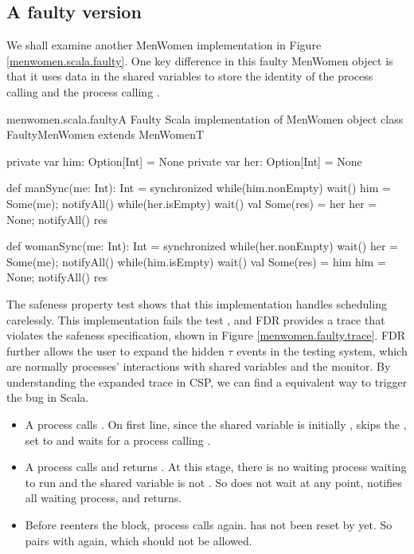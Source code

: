 \documentclass[a4paper, 12pt]{article}
\begin{document}
\subsection{A faulty version}
We shall examine another MenWomen implementation in Figure \ref{menwomen.scala.faulty}. One key difference in this faulty MenWomen object is that it uses  data in the shared variables to store the identity of the process calling  and the process calling . 

\begin{scalafloat}{menwomen.scala.faulty}{A Faulty Scala implementation of MenWomen object}
class FaultyMenWomen extends MenWomenT{
  private var him: Option[Int] = None
  private var her: Option[Int] = None

  def manSync(me: Int): Int = synchronized{
    while(him.nonEmpty) wait()
    him = Some(me); notifyAll()
    while(her.isEmpty) wait()   
    val Some(res) = her
    her = None; notifyAll()
    res
  }

  def womanSync(me: Int): Int = synchronized{
    while(her.nonEmpty) wait()
    her = Some(me); notifyAll()
    while(him.isEmpty) wait()  
    val Some(res) = him
    him = None; notifyAll()
    res
  }
}
\end{scalafloat}

The safeness property test shows that this implementation handles scheduling carelessly. This implementation fails the test \CSPM{Spec2Thread [T= System2}, and FDR provides a trace that violates the safeness specification, shown in Figure \ref{menwomen.faulty.trace}. FDR further allows the user to expand the hidden $\tau$ events in the testing system, which are normally processes' interactions with shared variables and the monitor. By understanding the expanded trace in CSP, we can find a equivalent way to trigger the bug in Scala.


\begin{itemize}
  \item A process  calls . On first line, since the shared variable  is initially ,  skips the , set  to  and waits for a process calling .
  \item A process  calls  and returns . At this stage, there is no waiting process waiting to run  and the shared variable is not . So  does not wait at any point, notifies all waiting process, and returns.
  \item Before  reenters the  block, process  calls  again.  has not been reset by  yet. So  pairs with  again, which should not be allowed. 
\end{itemize}
\end{document}
